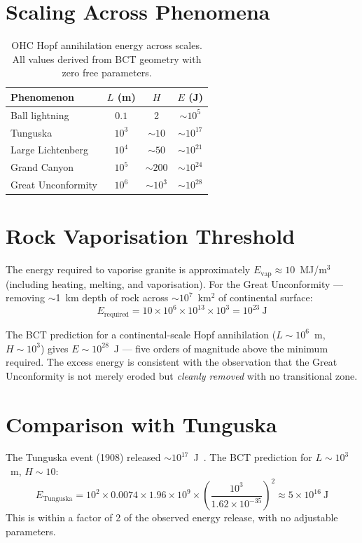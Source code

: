 \documentclass[aps,prl,twocolumn,superscriptaddress]{revtex4-2}
\begin{document}
\section{Scaling Across Phenomena}

\begin{table}[h]
\centering
\begin{tabular}{lccc}
\hline
Phenomenon & $L$ (m) & $H$ & $E$ (J) \\
\hline
Ball lightning & $0.1$ & 2 & $\sim 10^{5}$ \\
Tunguska & $10^3$ & $\sim 10$ & $\sim 10^{17}$ \\
Large Lichtenberg & $10^4$ & $\sim 50$ & $\sim 10^{21}$ \\
Grand Canyon & $10^5$ & $\sim 200$ & $\sim 10^{24}$ \\
Great Unconformity & $10^6$ & $\sim 10^3$ & $\sim 10^{28}$ \\
\hline
\end{tabular}
\caption{OHC Hopf annihilation energy across scales. All values derived from BCT geometry with zero free parameters.}
\end{table}

\section{Rock Vaporisation Threshold}

The energy required to vaporise granite is approximately $E_{\mathrm{vap}} \approx 10$~MJ/m$^3$ (including heating, melting, and vaporisation). For the Great Unconformity --- removing $\sim$1~km depth of rock across $\sim 10^7$~km$^2$ of continental surface:
\begin{equation}
E_{\mathrm{required}} = 10 \times 10^6 \times 10^{13} \times 10^3 = 10^{23}~\text{J}
\end{equation}

The BCT prediction for a continental-scale Hopf annihilation ($L \sim 10^6$~m, $H \sim 10^3$) gives $E \sim 10^{28}$~J --- five orders of magnitude above the minimum required. The excess energy is consistent with the observation that the Great Unconformity is not merely eroded but \emph{cleanly removed} with no transitional zone.

\section{Comparison with Tunguska}

The Tunguska event (1908) released $\sim 10^{17}$~J~\cite{Vasilyev1998}. The BCT prediction for $L \sim 10^3$~m, $H \sim 10$:
\begin{equation}
E_{\mathrm{Tunguska}} = 10^2 \times 0.0074 \times 1.96 \times 10^9 \times \left(\frac{10^3}{1.62 \times 10^{-35}}\right)^2 \approx 5 \times 10^{16}~\text{J}
\end{equation}
This is within a factor of 2 of the observed energy release, with no adjustable parameters.
\end{document}
